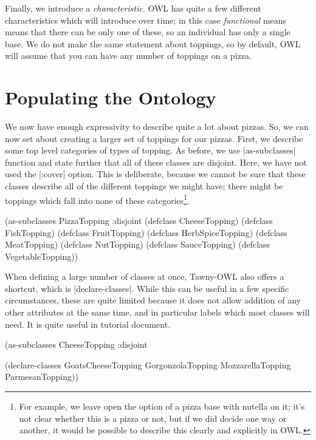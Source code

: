 Finally, we introduce a \emph{characteristic}. OWL has quite a few
different characteristics which will introduce over time; in this case
\emph{functional} means means that there can be only one of these, so
an individual has only a single base. We do not make the same
statement about toppings, so by default, OWL will assume that you can
have any number of toppings on a pizza.

\section{Populating the Ontology}
\label{sec:populating-ontology}

We now have enough expressivity to describe quite a lot about pizzas. So, we
can now set about creating a larger set of toppings for our pizzas. First, we
describe some top level categories of types of topping. As before, we use
|as-subclasses| function and state further that all of these classes are
disjoint. Here, we have not used the |:cover| option. This is deliberate,
because we cannot be sure that these classes describe all of the different
toppings we might have; there might be toppings which fall into none of these
categories\footnote{For example, we leave open the option of a pizza
  base with nutella on it; it's not clear whether this is a pizza or
  not, but if we did decide one way or another, it would be possible
  to describe this clearly and explicitly in OWL.}. 

\begin{tawny}
(as-subclasses
 PizzaTopping
 :disjoint
 (defclass CheeseTopping)
 (defclass FishTopping)
 (defclass FruitTopping)
 (defclass HerbSpiceTopping)
 (defclass MeatTopping)
 (defclass NutTopping)
 (defclass SauceTopping)
 (defclass VegetableTopping))
\end{tawny}

When defining a large number of classes at once, Tawny-OWL also offers
a shortcut, which is |declare-classes|. While this can be useful in a
few specific circumstances, these are quite limited because it does
not allow addition of any other attributes at the same time, and in
particular labels which most classes will need. It is quite useful in
tutorial document.

\begin{tawny}
(as-subclasses
 CheeseTopping
 :disjoint

 (declare-classes
  GoatsCheeseTopping
  GorgonzolaTopping
  MozzarellaTopping
  ParmesanTopping))
\end{tawny}

